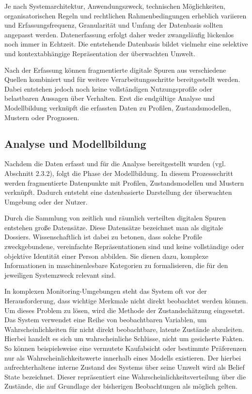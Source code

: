 Je nach Systemarchitektur, Anwendungszweck, technischen Möglichkeiten, organisatorischen Regeln und rechtlichen Rahmenbedingungen erheblich variieren und Erfassungsfrequenz, Granularität und Umfang der Datenbasis sollten angepasst werden. Datenerfassung erfolgt daher weder zwangsläufig lückenlos noch immer in Echtzeit. Die entstehende Datenbasis bildet vielmehr eine selektive und kontextabhängige Repräsentation der überwachten Umwelt.

Nach der Erfassung können fragmentierte digitale Spuren aus verschiedene Quellen kombiniert und für weitere Verarbeitungsschritte bereitgestellt werden. Dabei entstehen jedoch noch keine vollständigen Nutzungsprofile oder belastbaren Aussagen über Verhalten. Erst die endgültige Analyse und Modellbildung verknüpft die erfassten Daten zu Profilen, Zustandsmodellen, Mustern oder Prognosen.

\subsection{Analyse und Modellbildung}

Nachdem die Daten erfasst und für die Analyse bereitgestellt wurden (vgl. Abschnitt 2.3.2), folgt die Phase der Modellbildung. In diesem Prozessschritt werden fragmentierte Datenpunkte mit Profilen, Zustandsmodellen und Mustern verknüpft. Dadurch entsteht eine datenbasierte Darstellung der überwachten Umgebung oder der Nutzer.

Durch die Sammlung von zeitlich und räumlich verteilten digitalen Spuren entstehen große Datensätze. Diese Datensätze bezeichnet man als digitale Dossiers. Wissenschaftlich ist dabei zu betonen, dass solche Profile zweckgebundene, vereinfachte Repräsentationen sind und keine vollständige oder objektive Identität einer Person abbilden. Sie dienen dazu, komplexe Informationen in maschinenlesbare Kategorien zu formalisieren, die für den jeweiligen Systemzweck relevant sind.

In komplexen Monitoring-Umgebungen steht das System oft vor der Herausforderung, dass wichtige Merkmale nicht direkt beobachtet werden können. Um dieses Problem zu lösen, wird die Methode der Zustandschätzung eingesetzt. Das System verwendet eine Reihe von beobachtbaren Variablen, um Wahrscheinlichkeiten für nicht direkt beobachtbare, latente Zustände abzuleiten. Hierbei handelt es sich um wahrscheinliche Schlüsse, nicht um gesicherte Fakten. So können beispielsweise eine vermutete Kaufabsicht oder bestimmte Präferenzen nur als Wahrscheinlichkeitswerte innerhalb eines Modells existieren. Der hierbei aufrechterhaltene interne Zustand des Systems über seine Umwelt wird als Belief State bezeichnet. Dieser repräsentiert eine Wahrscheinlichkeitsverteilung über die Zustände, die auf Grundlage der bisherigen Beobachtungen als möglich gelten.

